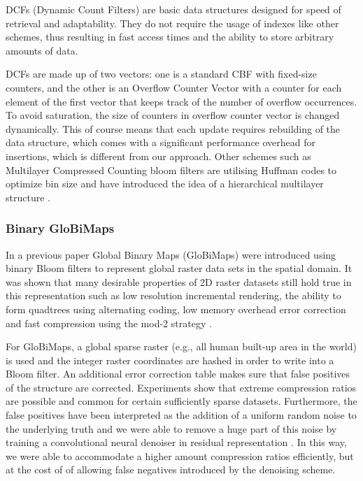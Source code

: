 \documentclass[sigconf, nonacm]{acmart}
\begin{document}
DCFs (Dynamic Count Filters) \cite{aguilar-saborit_dynamic_2006} are basic data structures designed for speed of retrieval and adaptability. They do not require the usage of indexes like other schemes, thus resulting in fast access times and the ability to store arbitrary amounts of data.

DCFs are made up of two vectors: one is a standard CBF with fixed-size counters, and the other is an Overflow Counter Vector with a counter for each element of the first vector that keeps track of the number of overflow occurrences. To avoid saturation, the size of counters in overflow counter vector is changed dynamically.
This of course means that each update requires rebuilding of the data structure, which comes with a significant performance overhead for insertions, which is different from our approach.  Other schemes such as Multilayer Compressed Counting bloom filters are utilising Huffman codes to optimize bin size and have introduced the idea of a hierarchical multilayer structure \cite{ficara_multilayer_2008}.

\subsubsection{Binary GloBiMaps}

In a previous paper Global Binary Maps (GloBiMaps) were introduced using binary Bloom filters to represent global raster data sets in the spatial domain. It was shown that many desirable properties of 2D raster datasets still hold true in this representation such as low resolution incremental rendering, the ability to form quadtrees using alternating coding, low memory overhead error correction and fast compression using the mod-2 strategy \cite{werner2019globimaps}.

For GloBiMaps, a global sparse raster (e.g., all human built-up area in the world) is used and the integer raster coordinates are hashed in order to write into a Bloom filter. An additional error correction table makes sure that false positives of the structure are corrected. Experiments show that extreme compression ratios are possible and common for certain sufficiently sparse datasets. Furthermore, the false positives have been interpreted as the addition of a uniform random noise to the underlying truth and we were able to remove a huge part of this noise by training a convolutional neural denoiser in residual representation \cite{werner2021globimapsai}. In this way, we were able to accommodate a higher amount compression ratios efficiently, but at the cost of of allowing false negatives introduced by the denoising scheme.
\end{document}
